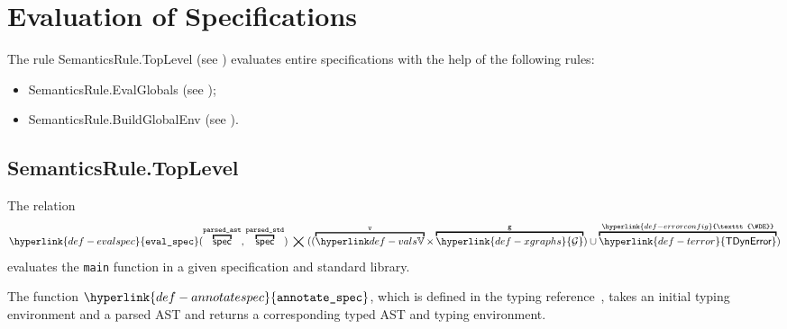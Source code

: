 \documentclass{book}
\newcommand\XGraphs[0]{\hyperlink{def-xgraphs}{\mathcal{G}}}
\newcommand\ErrorConfig[0]{\hyperlink{def-errorconfig}{\texttt{\#DE}}}
\newcommand\TError[0]{\hyperlink{def-terror}{\textsf{TDynError}}}
\newcommand\evalspec[1]{\hyperlink{def-evalspec}{\texttt{eval\_spec}}(#1)}
\newcommand\parsedstd[0]{\texttt{parsed\_std}}
\newcommand\parsedast[0]{\texttt{parsed\_ast}}
\newcommand\vg[0]{\texttt{g}}
\begin{document}

\chapter{Evaluation of Specifications \label{chap:eval_spec}}
The rule SemanticsRule.TopLevel (see )
evaluates entire specifications with the help of the following rules:
\begin{itemize}
  \item SemanticsRule.EvalGlobals (see );
  \item SemanticsRule.BuildGlobalEnv (see ).
\end{itemize}

\section{SemanticsRule.TopLevel \label{sec:SemanticsRule.TopLevel}}
The relation
\hypertarget{def-evalspec}{}
\[
  \evalspec{\overname{\spec}{\parsedast}, \overname{\spec}{\parsedstd}} \;\aslrel\;
   ((\overname{\vals}{\vv}\times \overname{\XGraphs}{\vg}) \cup \overname{\TError}{\ErrorConfig})
\]
evaluates the \texttt{main} function in a given specification and standard library.

\newcommand\annotatespec[0]{\hyperlink{def-annotatespec}{\texttt{annotate\_spec}}}
\hypertarget{def-annotatespec}{}
The function $\annotatespec$, which is defined in the typing reference~\cite{ASLTypingReference},
takes an initial typing environment and a parsed AST and returns a corresponding typed AST and typing
environment.
\end{document}
